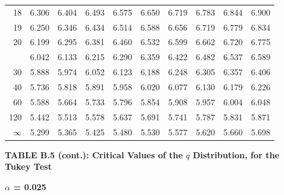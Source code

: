 \documentclass[10pt]{article}
\begin{document}
\begin{longtable}{@{}r!{\vrule width 0.8pt\hspace{0.55em}}rrrrrrrrr@{}}
18 & 6.306 & 6.404 & 6.493 & 6.575 & 6.650 & 6.719 & 6.783 & 6.844 & 6.900 \\
19 & 6.250 & 6.346 & 6.434 & 6.514 & 6.588 & 6.656 & 6.719 & 6.779 & 6.834 \\
20 & 6.199 & 6.295 & 6.381 & 6.460 & 6.532 & 6.599 & 6.662 & 6.720 & 6.775 \\
 & 6.042 & 6.133 & 6.215 & 6.290 & 6.359 & 6.422 & 6.482 & 6.537 & 6.589 \\
30 & 5.888 & 5.974 & 6.052 & 6.123 & 6.188 & 6.248 & 6.305 & 6.357 & 6.406 \\
40 & 5.736 & 5.818 & 5.891 & 5.958 & 6.020 & 6.077 & 6.130 & 6.179 & 6.226 \\
60 & 5.588 & 5.664 & 5.733 & 5.796 & 5.854 & 5.908 & 5.957 & 6.004 & 6.048 \\
120 & 5.442 & 5.513 & 5.578 & 5.637 & 5.691 & 5.741 & 5.787 & 5.831 & 5.871 \\
\addlinespace[0.30em]
$\infty$ & 5.299 & 5.365 & 5.425 & 5.480 & 5.530 & 5.577 & 5.620 & 5.660 & 5.698 \\
\end{longtable}
\newpage
\thispagestyle{empty}
\begin{center}
{\large\bfseries TABLE B.5 (cont.): Critical Values of the $q$ Distribution, for the Tukey Test\par}
\end{center}
{\large\bfseries $\alpha$ = 0.025\par}
\vspace{0.45em}
\small
\end{document}
